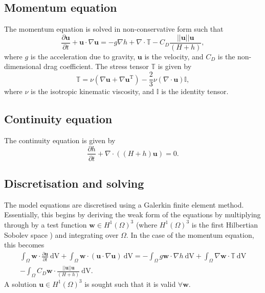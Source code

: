 \documentclass[a4paper,11pt]{report}
\begin{document}
\subsection{Momentum equation}
The momentum equation is solved in non-conservative form such that
\begin{equation}
   \frac{\partial \mathbf{u}}{\partial t} + \mathbf{u}\cdot\nabla\mathbf{u} = -g\nabla h + \nabla\cdot\mathbb{T} - C_D\frac{||\mathbf{u}||\mathbf{u}}{(H + h)},
\end{equation}
where $g$ is the acceleration due to gravity, $\mathbf{u}$ is the velocity, and $C_D$ is the non-dimensional drag coefficient. The stress tensor $\mathbb{T}$ is given by 
\begin{equation}
   \mathbb{T} = \nu\left(\nabla\mathbf{u} + \nabla\mathbf{u}^{\mathrm{T}}\right) - \frac{2}{3}\nu\left(\nabla\cdot\mathbf{u}\right)\mathbb{I},
\end{equation}
where $\nu$ is the isotropic kinematic viscosity, and $\mathbb{I}$ is the identity tensor.

\subsection{Continuity equation}
The continuity equation is given by
\begin{equation}
   \frac{\partial h}{\partial t} + \nabla\cdot\left(\left(H + h\right)\mathbf{u}\right) = 0.
\end{equation}

\subsection{Discretisation and solving}
The model equations are discretised using a Galerkin finite element method. Essentially, this begins by deriving the weak form of the equations by multiplying through by a test function $\mathbf{w} \in H^1(\Omega)^3$ (where $H^1(\Omega)^3$ is the first Hilbertian Sobolev space \citep{Elman_etal_2005}) and integrating over $\Omega$. In the case of the momentum equation, this becomes
\begin{eqnarray}
   \nonumber\int_{\Omega}\mathbf{w}\cdot\frac{\partial \mathbf{u}}{\partial t}\ \mathrm{dV} + \int_{\Omega}\mathbf{w}\cdot(\mathbf{u}\cdot\nabla\mathbf{u}) \ \mathrm{dV} = -\int_{\Omega}g\mathbf{w}\cdot\nabla h \ \mathrm{dV} + \int_{\Omega}\nabla\mathbf{w}\cdot \mathbb{T} \ \mathrm{dV} \\- \int_{\Omega}C_D\mathbf{w}\cdot\frac{||\mathbf{u}||\mathbf{u}}{(H + h)} \ \mathrm{dV}.
\end{eqnarray}
A solution $\mathbf{u} \in H^1(\Omega)^3$ is sought such that it is valid $\forall \mathbf{w}$.
\end{document}
